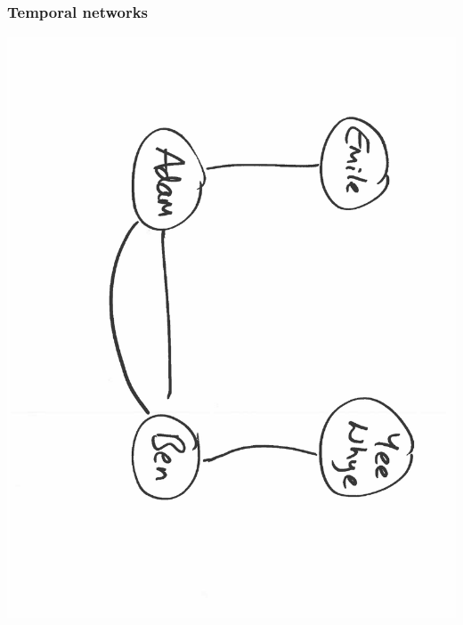 \documentclass[final,hyperref={pdfpagelabels=false},noamsthm]{beamer}
\begin{document}
\begin{frame}
	\frametitle{Temporal networks}
	\includegraphics[angle=90,origin=c,scale=0.4]{fig/socialnet4}
\end{frame}
\end{document}
